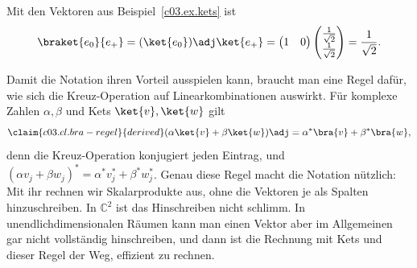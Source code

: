 \begin{example}\label{c03.ex.braket}
  Mit den Vektoren aus Beispiel~\ref{c03.ex.kets} ist
  \begin{equation}\label{c03.eq.e0eplus}
    \braket{e_0}{e_+} = (\ket{e_0})\adj \ket{e_+}
    = \begin{pmatrix} 1 & 0 \end{pmatrix}
      \begin{pmatrix} \frac{1}{\sqrt{2}} \\ \frac{1}{\sqrt{2}} \end{pmatrix}
    = \frac{1}{\sqrt{2}} .
  \end{equation}
\end{example}

Damit die Notation ihren Vorteil ausspielen kann, braucht man eine Regel dafür, wie sich die
Kreuz-Operation auf Linearkombinationen auswirkt. Für komplexe Zahlen $\alpha, \beta$ und
Kets $\ket{v}, \ket{w}$ gilt
\begin{equation}\label{c03.eq.bra-regel}\claim{c03.cl.bra-regel}{derived}
  (\alpha \ket{v} + \beta \ket{w})\adj = \alpha^* \bra{v} + \beta^* \bra{w} ,
\end{equation}
denn die Kreuz-Operation konjugiert jeden Eintrag, und
$(\alpha v_j + \beta w_j)^* = \alpha^* v_j^* + \beta^* w_j^*$. Genau diese Regel macht die
Notation nützlich: Mit ihr rechnen wir Skalarprodukte aus, ohne die Vektoren je als Spalten
hinzuschreiben. In $\mathbb{C}^2$ ist das Hinschreiben nicht schlimm. In unendlichdimensionalen
Räumen kann man einen Vektor aber im Allgemeinen gar nicht vollständig hinschreiben, und dann
ist die Rechnung mit Kets und dieser Regel der Weg, effizient zu rechnen.

